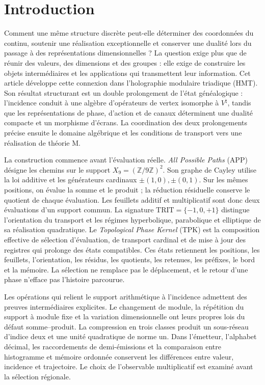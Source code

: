 \section{Introduction}
\label{iv:introduccion}
\begingroup
\fontsize{10.5}{12.8}\selectfont
\setlength{\parskip}{1pt plus .5pt minus .25pt}

Comment une même structure discrète peut-elle déterminer des coordonnées du
continu, soutenir une réalisation exceptionnelle et conserver une dualité
lors du passage à des représentations dimensionnelles ? La question exige plus
que de réunir des valeurs, des dimensions et des groupes : elle exige de construire les objets
intermédiaires et les applications qui transmettent leur information. Cet
article développe cette connexion dans l’holographie modulaire triadique (HMT).
Son résultat structurant est un double prolongement de l’état
généalogique : l’incidence conduit à une algèbre d’opérateurs de vertex
isomorphe à \(V^\natural\), tandis que les représentations de phase, d’action
et de canaux déterminent une dualité compacte et un morphisme d’écrans.
La coordination des deux prolongements précise ensuite le domaine
algébrique et les conditions de transport vers une réalisation de
théorie M.

La construction commence avant l’évaluation réelle.
\emph{All Possible Paths} (APP) désigne les chemins sur le support
\(X_9=(\mathbb Z/9\mathbb Z)^2\). Son graphe de Cayley utilise la loi
additive et les générateurs cardinaux \(\pm(1,0),\pm(0,1)\). Sur les
mêmes positions, on évalue la somme et le produit ; la réduction résiduelle
conserve le quotient de chaque évaluation. Les feuillets additif et
multiplicatif sont donc deux évaluations d’un support commun.
La signature \(\mathrm{TRIT}=\{-1,0,+1\}\) distingue l’orientation du
transport et les régimes hyperbolique, parabolique et elliptique de sa
réalisation quadratique. Le \emph{Topological Phase Kernel} (TPK) est la
composition effective de sélection d’évaluation, de transport cardinal
et de mise à jour des registres qui prolonge des états compatibles. Ces
états retiennent les positions, les feuillets, l’orientation, les résidus, les quotients,
les retenues, les préfixes, le bord et la mémoire. La sélection ne remplace pas le
déplacement, et le retour d’une phase n’efface pas l’histoire parcourue.

Les opérations qui relient le support arithmétique à l’incidence
admettent des preuves intermédiaires explicites. Le changement de module, la répétition
du support à module fixe et la variation dimensionnelle ont leurs propres
lois du défaut somme--produit. La compression en trois classes produit
un sous-réseau d’indice deux et une unité quadratique de norme un.
Dans l’émetteur, l’alphabet décimal, les raccordements de demi-émissions et la
comparaison entre histogramme et mémoire ordonnée conservent les différences
entre valeur, incidence et trajectoire. Le choix de l’observable
multiplicatif est examiné avant la sélection régionale.

